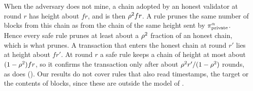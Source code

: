 When the adversary does not mine, a chain adopted by an honest validator at
round $r$ has height about $fr$, and  is then
$\rho^2fr$. A rule prunes the same number of blocks from this chain as from
the chain of the same height sent by $\pi_{\mathrm{private}}^\alpha$. Hence every safe rule
prunes at least about a $\rho^2$ fraction of an honest chain, which is what
 prunes. A transaction that enters the honest chain at round
$r'$ lies at height about $fr'$. At round $r$ a safe rule keeps a chain of
height at most about $(1-\rho^2)fr$, so it confirms the transaction only
after about $\rho^2r'/(1-\rho^2)$ rounds, as  does
(). Our results do not cover rules that
also read timestamps, the target or the contents of blocks, since these are
outside the model of .
